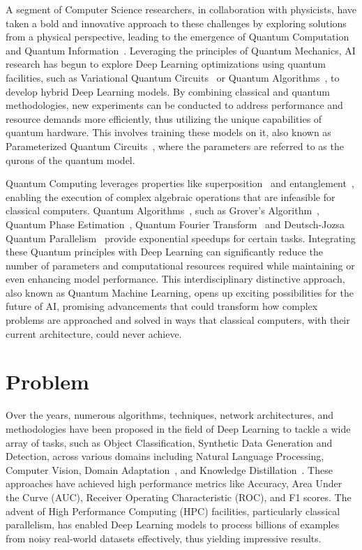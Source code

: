 \documentclass[12pt,a4paper]{report}
\begin{document}
A segment of Computer Science researchers, in collaboration with physicists, have taken a bold and innovative approach to these challenges by exploring solutions from a physical perspective, leading to the emergence of Quantum Computation and Quantum Information~\cite{nielsen2001quantum}. Leveraging the principles of Quantum Mechanics, AI research has begun to explore Deep Learning optimizations using quantum facilities, such as Variational Quantum Circuits~\cite{benedetti2019parameterized} or Quantum Algorithms~\cite{cerezo2021variational}, to develop hybrid Deep Learning models. By combining classical and quantum methodologies, new experiments can be conducted to address performance and resource demands more efficiently, thus utilizing the unique capabilities of quantum hardware. This involves training these models on it, also known as Parameterized Quantum Circuits~\cite{benedetti2019parameterized}, where the parameters are referred to as the qurons of the quantum model.

Quantum Computing leverages properties like superposition~\cite{koprinkov2023quantum} and entanglement~\cite{Horodecki_2009}, enabling the execution of complex algebraic operations that are infeasible for classical computers. Quantum Algorithms~\cite{cerezo2021variational}, such as Grover's Algorithm~\cite{shi2017coherence}, Quantum Phase Estimation~\cite{o2019quantum}, Quantum Fourier Transform~\cite{weinstein2001implementation} and Deutsch-Jozsa Quantum Parallelism~\cite{gulde2003implementation} provide exponential speedups for certain tasks. Integrating these Quantum principles with Deep Learning can significantly reduce the number of parameters and computational resources required while maintaining or even enhancing model performance. This interdisciplinary distinctive approach, also known as Quantum Machine Learning, opens up exciting possibilities for the future of AI, promising advancements that could transform how complex problems are approached and solved in ways that classical computers, with their current architecture, could never achieve.
\section{Problem}\vspace{-12pt}
Over the years, numerous algorithms, techniques, network architectures, and methodologies have been proposed in the field of Deep Learning to tackle a wide array of tasks, such as Object Classification, Synthetic Data Generation and Detection, across various domains including Natural Language Processing, Computer Vision, Domain Adaptation~\cite{farahani2020brief}, and Knowledge Distillation~\cite{hinton2015distilling}. These approaches have achieved high performance metrics like Accuracy, Area Under the Curve (AUC), Receiver Operating Characteristic (ROC), and F1 scores. The advent of High Performance Computing (HPC) facilities, particularly classical parallelism, has enabled Deep Learning models to process billions of examples from noisy real-world datasets effectively, thus yielding impressive results.
\end{document}
